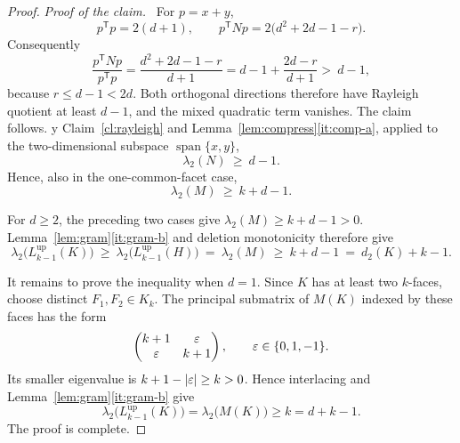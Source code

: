 \documentclass[10pt,a4paper]{amsart}
\newcommand{\Lup}{L^{\mathrm{up}}}
\newcommand{\T}{\mathsf{T}}
\newenvironment{claimproof}
  {\par\smallskip\noindent\textit{Proof of the claim.}\ }
\newcommand{\eps}{\varepsilon}
\DeclareMathOperator{\spn}{span}
\begin{document}
\begin{proof}
\begin{claimproof}
For $p=x+y$,
\[
  p^{\T}p=2(d+1),\qquad p^{\T}Np=2\bigl(d^2+2d-1-r\bigr) .
\]
Consequently
\[
  \frac{p^{\T}Np}{p^{\T}p}
  =\frac{d^2+2d-1-r}{d+1}
  =d-1+\frac{2d-r}{d+1} >\ d-1 ,
\]
because $r\le d-1<2d$. Both orthogonal directions therefore have Rayleigh quotient at least
$d-1$, and the mixed quadratic term vanishes. The claim follows.
\end{claimproof}

By Claim~\ref{cl:rayleigh} and Lemma~\ref{lem:compress}\ref{it:comp-a}, applied to the
two-dimensional subspace $\spn\{x,y\}$,
\[
  \lambda_2(N)\ \ge\ d-1 .
\]
Hence, also in the one-common-facet case,
\[
  \lambda_2(M)\ \ge\ k+d-1 .
\]

\medskip
\noindent

For $d\ge2$, the preceding two cases give $\lambda_2(M)\ge k+d-1>0$.
Lemma~\ref{lem:gram}\ref{it:gram-b} and deletion monotonicity therefore give
\[
  \lambda_2\bigl(\Lup_{k-1}(K)\bigr)
  \ \ge\ \lambda_2\bigl(\Lup_{k-1}(H)\bigr)
  \ =\ \lambda_2(M)
  \ \ge\ k+d-1
  \ =\ d_2(K)+k-1 .
\]

\medskip
It remains to prove the inequality when $d=1$. Since $K$ has at least two $k$-faces, choose
distinct $F_1,F_2\in K_k$. The
principal submatrix of $M(K)$ indexed by these faces has the form
\[
  \begin{pmatrix}k+1&\eps\\ \eps&k+1\end{pmatrix},
  \qquad \eps\in\{0,1,-1\}.
\]
Its smaller eigenvalue is $k+1-|\eps|\ge k>0$. Hence interlacing and
Lemma~\ref{lem:gram}\ref{it:gram-b} give
\[
  \lambda_2\bigl(\Lup_{k-1}(K)\bigr)
  =\lambda_2\bigl(M(K)\bigr)\ge k=d+k-1 .
\]
The proof is complete.
\end{proof}
\end{document}
